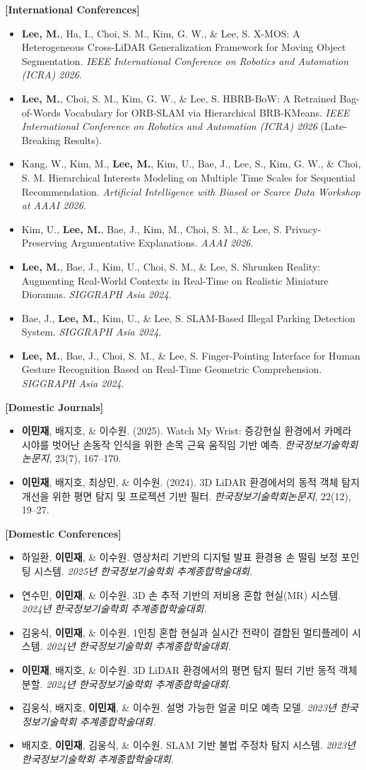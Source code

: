 \documentclass[letterpaper,11pt]{article}
\newcommand{\resumeItem}[1]{
  \item\small{
    {#1 \vspace{0pt}}
  }
}
\newcommand{\resumeSubHeadingListStart}{\begin{itemize}[leftmargin=*]}
\newcommand{\resumeSubHeadingListEnd}{\end{itemize}}
\begin{document}
\textbf{[International Conferences]}
\resumeSubHeadingListStart
\resumeItem{\textbf{Lee, M.}, Ha, I., Choi, S. M., Kim, G. W., \& Lee, S. X-MOS: A Heterogeneous Cross-LiDAR Generalization Framework for Moving Object Segmentation. \textit{IEEE International Conference on Robotics and Automation (ICRA) 2026}.}
\resumeItem{\textbf{Lee, M.}, Choi, S. M., Kim, G. W., \& Lee, S. HBRB-BoW: A Retrained Bag-of-Words Vocabulary for ORB-SLAM via Hierarchical BRB-KMeans. \textit{IEEE International Conference on Robotics and Automation (ICRA) 2026} (Late-Breaking Results).}
\resumeItem{Kang, W., Kim, M., \textbf{Lee, M.}, Kim, U., Bae, J., Lee, S., Kim, G. W., \& Choi, S. M. Hierarchical Interests Modeling on Multiple Time Scales for Sequential Recommendation. \textit{Artificial Intelligence with Biased or Scarce Data Workshop at AAAI 2026}.}
\resumeItem{Kim, U., \textbf{Lee, M.}, Bae, J., Kim, M., Choi, S. M., \& Lee, S. Privacy-Preserving Argumentative Explanations. \textit{AAAI 2026}.}
\resumeItem{\textbf{Lee, M.}, Bae, J., Kim, U., Choi, S. M., \& Lee, S. Shrunken Reality: Augmenting Real-World Contexts in Real-Time on Realistic Miniature Dioramas. \textit{SIGGRAPH Asia 2024}.}
\resumeItem{Bae, J., \textbf{Lee, M.}, Kim, U., \& Lee, S. SLAM-Based Illegal Parking Detection System. \textit{SIGGRAPH Asia 2024}.}
\resumeItem{\textbf{Lee, M.}, Bae, J., Choi, S. M., \& Lee, S. Finger-Pointing Interface for Human Gesture Recognition Based on Real-Time Geometric Comprehension. \textit{SIGGRAPH Asia 2024}.}
\resumeSubHeadingListEnd

\textbf{[Domestic Journals]}
\resumeSubHeadingListStart
\resumeItem{\textbf{이민재}, 배지호, \& 이수원. (2025). Watch My Wrist: 증강현실 환경에서 카메라 시야를 벗어난 손동작 인식을 위한 손목 근육 움직임 기반 예측. \textit{한국정보기술학회논문지}, 23(7), 167--170.}
\resumeItem{\textbf{이민재}, 배지호, 최상민, \& 이수원. (2024). 3D LiDAR 환경에서의 동적 객체 탐지 개선을 위한 평면 탐지 및 프로젝션 기반 필터. \textit{한국정보기술학회논문지}, 22(12), 19--27.}
\resumeSubHeadingListEnd

\textbf{[Domestic Conferences]}
\resumeSubHeadingListStart
\resumeItem{하일환, \textbf{이민재}, \& 이수원. 영상처리 기반의 디지털 발표 환경용 손 떨림 보정 포인팅 시스템. \textit{2025년 한국정보기술학회 추계종합학술대회}.}
\resumeItem{연수민, \textbf{이민재}, \& 이수원. 3D 손 추적 기반의 저비용 혼합 현실(MR) 시스템. \textit{2024년 한국정보기술학회 추계종합학술대회}.}
\resumeItem{김웅식, \textbf{이민재}, \& 이수원. 1인칭 혼합 현실과 실시간 전략이 결합된 멀티플레이 시스템. \textit{2024년 한국정보기술학회 추계종합학술대회}.}
\resumeItem{\textbf{이민재}, 배지호, \& 이수원. 3D LiDAR 환경에서의 평면 탐지 필터 기반 동적 객체 분할. \textit{2024년 한국정보기술학회 추계종합학술대회}.}
\resumeItem{김웅식, 배지호, \textbf{이민재}, \& 이수원. 설명 가능한 얼굴 미모 예측 모델. \textit{2023년 한국정보기술학회 추계종합학술대회}.}
\resumeItem{배지호, \textbf{이민재}, 김웅식, \& 이수원. SLAM 기반 불법 주정차 탐지 시스템. \textit{2023년 한국정보기술학회 추계종합학술대회}.}
\resumeSubHeadingListEnd

\end{document}
